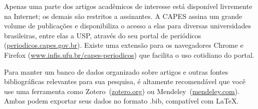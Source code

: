 Apenas uma parte dos artigos acadêmicos de interesse está disponível livremente
na Internet; os demais são restritos a assinantes. A CAPES assina um grande
volume de publicações e disponibiliza o acesso a elas para diversas universidades
brasileiras, entre elas a USP, através do seu portal de periódicos
(\url{periodicos.capes.gov.br}). Existe uma extensão para os navegadores
Chrome e Firefox (\url{www.infis.ufu.br/capes-periodicos}) que facilita o uso
cotidiano do portal.

Para manter um banco de dados organizado sobre artigos e outras fontes bibliográficas
relevantes para sua pesquisa, é altamente recomendável que você use uma ferramenta
como Zotero~(\url{zotero.org}) ou
Mendeley~(\url{mendeley.com}). Ambas podem exportar seus dados no
formato .bib, compatível com \LaTeX{}.

